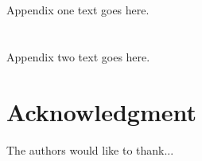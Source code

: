 \documentclass[journal]{IEEEtran}
\begin{document}
%


\appendices
\section{}
Appendix one text goes here.

\section{}
Appendix two text goes here.


\section*{Acknowledgment}


The authors would like to thank...


\ifCLASSOPTIONcaptionsoff
  \newpage
\fi





%
%
%


\end{document}
